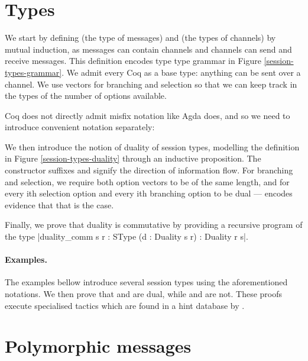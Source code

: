 \documentclass{mproj}
\begin{document}
\section{Types}\label{types}

We start by defining  (the type of messages) and  (the types of channels) by mutual induction, as messages can contain channels and channels can send and receive messages. This definition encodes type type grammar in Figure \ref{session-types-grammar}. We admit every Coq  as a base type: anything can be sent over a channel. We use vectors for branching and selection so that we can keep track in the types of the number of options available.


Coq does not directly admit misfix notation like Agda does, and so we need to introduce convenient notation separately:


We then introduce the notion of duality of session types, modelling the definition in Figure \ref{session-types-duality} through an inductive proposition. The constructor suffixes  and  signify the direction of information flow. For branching and selection, we require both option vectors to be of the same length, and for every ith selection option and every ith branching option to be dual ---  encodes evidence that that is the case. 


Finally, we prove that duality is commutative by providing a recursive program of the type \coqe|duality_comm {s r : SType} (d : Duality s r) : Duality r s|.

\paragraph{Examples.}
The examples bellow introduce several session types using the aforementioned notations. We then prove that  and  are dual, while  and  are not. These proofs execute specialised tactics which are found in a hint database by .


\section{Polymorphic messages}\label{polymorphism}
\end{document}
